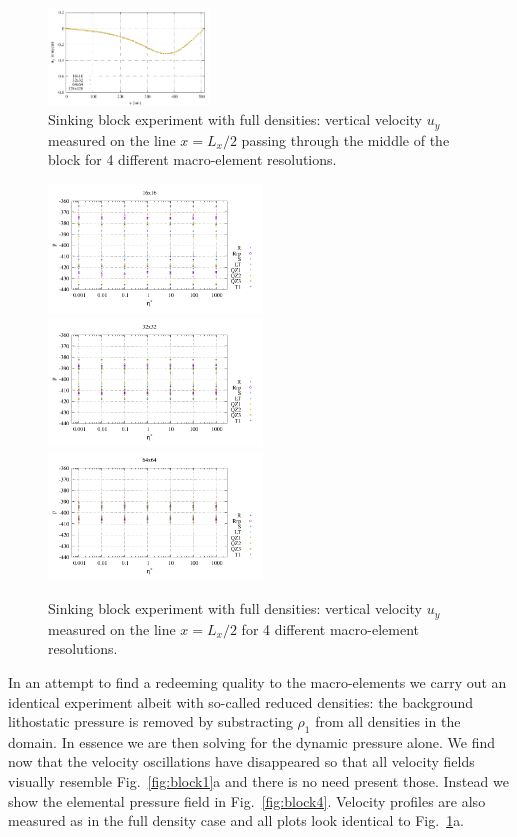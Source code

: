 \documentclass[a4paper,12pt]{article}
\begin{document}
\begin{figure}[t]
\includegraphics[width=4.3cm]{../results/exp08/vel_profile_topo7_full.pdf}
\caption{Sinking block experiment with full densities: vertical velocity $u_y$
measured on the line $x=L_x/2$ passing through the middle of the block
for 4 different macro-element resolutions. \label{fig:block2}}
\end{figure}

\begin{figure}[t]
\centering
\includegraphics[width=5.7cm]{../results/exp08/p_block_res16.pdf}
\includegraphics[width=5.7cm]{../results/exp08/p_block_res32.pdf}
\includegraphics[width=5.7cm]{../results/exp08/p_block_res64.pdf}
\caption{Sinking block experiment with full densities: vertical velocity $u_y$
measured on the line $x=L_x/2$ for 4 different macro-element resolutions. \label{fig:block3}}
\end{figure}



In an attempt to find a redeeming quality to the macro-elements 
we carry out an identical experiment albeit with so-called reduced densities:
the background lithostatic pressure is removed by substracting $\rho_1$
from all densities in the domain. In essence we are then solving for the dynamic
pressure alone. 
We find now that the velocity oscillations have disappeared 
so that all velocity fields visually resemble Fig.~\ref{fig:block1}a and 
there is no need present those. Instead we show the elemental pressure field in Fig.~\ref{fig:block4}.
Velocity profiles are also measured as in the full density case and 
all plots look identical to Fig.~\ref{fig:block2}a.
\end{document}
